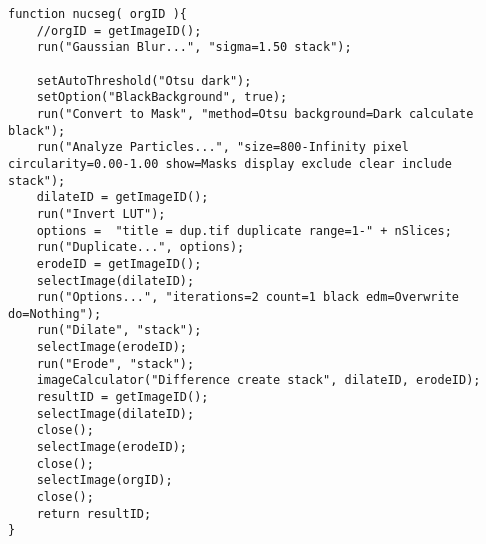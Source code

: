 \begin{lstlisting}
function nucseg( orgID ){
	//orgID = getImageID();
	run("Gaussian Blur...", "sigma=1.50 stack");
	
	setAutoThreshold("Otsu dark");
	setOption("BlackBackground", true);
	run("Convert to Mask", "method=Otsu background=Dark calculate black");
	run("Analyze Particles...", "size=800-Infinity pixel circularity=0.00-1.00 show=Masks display exclude clear include stack");
	dilateID = getImageID();
	run("Invert LUT");
	options =  "title = dup.tif duplicate range=1-" + nSlices;
	run("Duplicate...", options);
	erodeID = getImageID();
	selectImage(dilateID);
	run("Options...", "iterations=2 count=1 black edm=Overwrite do=Nothing");
	run("Dilate", "stack");
	selectImage(erodeID);
	run("Erode", "stack");
	imageCalculator("Difference create stack", dilateID, erodeID);
	resultID = getImageID();
	selectImage(dilateID);
	close();
	selectImage(erodeID);
	close();
	selectImage(orgID);
	close();
	return resultID;
}
\end{lstlisting}